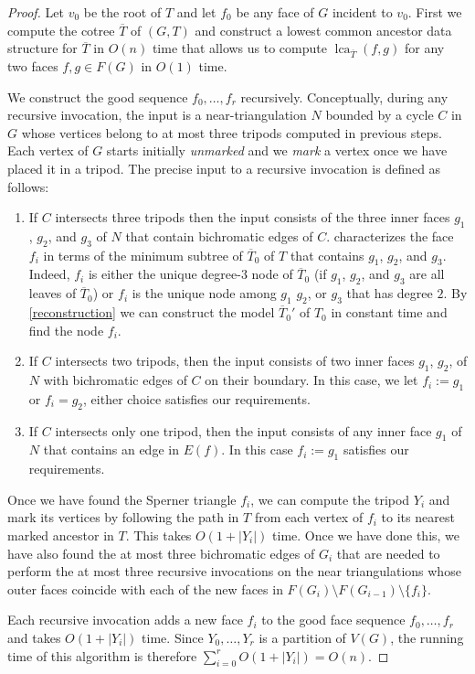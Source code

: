\documentclass{patmorin}
\DeclareMathOperator{\lca}{lca}
\begin{document}
\begin{proof}
  Let $v_0$ be the root of $T$ and let $f_0$ be any face of $G$ incident to $v_0$.  First we compute the cotree $\overline{T}$ of $(G,T)$ and construct a lowest common ancestor data structure for $\overline{T}$ in $O(n)$ time that allows us to compute $\lca_{\overline{T}}(f,g)$ for any two faces $f,g\in F(G)$ in $O(1)$ time.

  We construct the good sequence $f_0,\ldots,f_{r}$ recursively. Conceptually, during any recursive invocation, the input is a near-triangulation $N$ bounded by a cycle $C$ in $G$ whose vertices belong to at most three tripods computed in previous steps.  Each vertex of $G$ starts initially \emph{unmarked} and we \emph{mark} a vertex once we have placed it in a tripod.  The precise input to a recursive invocation is defined as follows:
  \begin{enumerate}
    \item If $C$ intersects three tripods then the input consists of the three inner faces $g_1$, $g_2$, and $g_3$ of $N$ that contain bichromatic edges of $C$.   characterizes the face $f_i$ in terms of the minimum subtree of $\overline{T}_0$ of $T$ that contains $g_1$, $g_2$, and $g_3$.  Indeed, $f_i$ is either the unique degree-$3$ node of $\overline{T}_0$ (if $g_1$, $g_2$, and $g_3$ are all leaves of $\overline{T}_0$) or $f_i$ is the unique node among $g_1$ $g_2$, or $g_3$ that has degree $2$.  By \cref{reconstruction} we can construct the model $\overline{T}_0'$ of $T_0$ in constant time and find the node $f_i$.

    \item If $C$ intersects two tripods, then the input consists of two inner faces $g_1$, $g_2$, of $N$ with bichromatic edges of $C$ on their boundary.  In this case, we let $f_i:=g_1$ or $f_i=g_2$, either choice satisfies our requirements.

    \item If $C$ intersects only one tripod, then the input consists of any inner face $g_1$ of $N$ that contains an edge in $E(f)$.  In this case $f_i:=g_1$ satisfies our requirements.
\end{enumerate}
Once we have found the Sperner triangle $f_i$, we can compute the tripod $Y_i$ and mark its vertices by following the path in $T$ from each vertex of $f_i$ to its nearest marked ancestor in $T$.  This takes $O(1+|Y_i|)$ time.  Once we have done this, we have also found the at most three bichromatic edges of $G_i$ that are needed to perform the at most three recursive invocations on the near triangulations whose outer faces coincide with each of the new faces in $F(G_i)\setminus F(G_{i-1})\setminus\{f_i\}$.

Each recursive invocation adds a new face $f_i$ to the good face sequence $f_0,\ldots,f_{r}$ and takes $O(1+|Y_i|)$ time.  Since $Y_0,\ldots,Y_{r}$ is a partition of $V(G)$, the running time of this algorithm is therefore $\sum_{i=0}^{r} O(1+|Y_i|) = O(n)$.
\end{proof}
\end{document}
